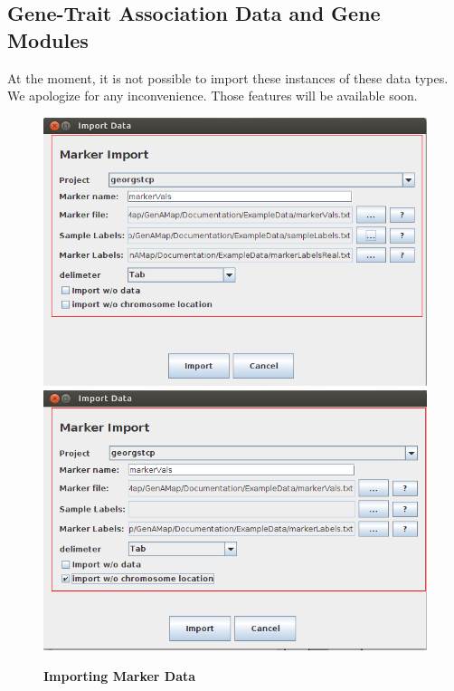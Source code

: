\documentclass{article}
\begin{document}
\subsection{Gene-Trait Association Data and Gene Modules}

At the moment, it is not possible to import these instances of these data types. We apologize for any inconvenience. Those features will be available soon.

\clearpage

\begin{figure}
\includegraphics[width=\textwidth]{Figure1a.png}
\includegraphics[width=\textwidth]{Figure1b.png}
\caption{\textbf{Importing Marker Data}}
\label{marker}
\end{figure}
\end{document}
